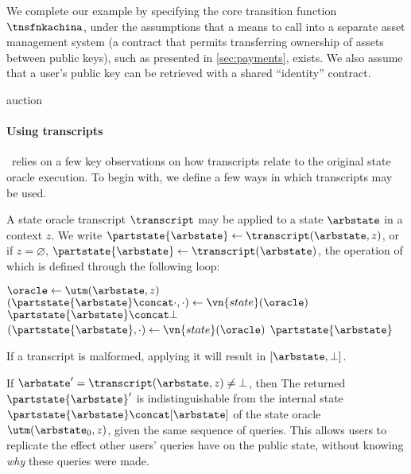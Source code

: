 We complete our example by specifying the core transition function $\tnsfnkachina$,
under the assumptions that a means to call into a separate asset management
system (a contract that permits transferring ownership of assets between public
keys), such as presented in \iffull\autoref{sec:payments}\else\cite[Appendix~J.4]{fullversion}\fi, exists. We also assume that
a user's public key can be retrieved with a shared ``identity'' contract.

{auction}


\paragraph{Using transcripts}
\kachina\ relies on a few key observations on how transcripts relate to the
original state oracle execution. To begin with, we define a few ways in which
transcripts may be used.
\begin{definition}
  A state oracle transcript $\transcript$ may be applied to a state $\arbstate$
  in a context $z$. We write $\partstate{\arbstate} \gets \transcript(\arbstate, z)$, or if
  $z = \varnothing$, $\partstate{\arbstate} \gets \transcript(\arbstate)$, the operation of
  which is defined through the following loop:
  \begin{algorithmic}
      \State \Let $\oracle \gets \utm(\arbstate, z)$
        \State {}
          \State \Let $(\partstate{\arbstate} \concat \cdot, \cdot) \gets \vn{state}(\oracle)$
          \State \Return $\partstate{\arbstate} \concat \bot$
        \EndIf
      \EndFor
      \State \Let $(\partstate{\arbstate}, \cdot) \gets \vn{state}(\oracle)$
      \State \Return $\partstate{\arbstate}$
    \EndFunction
  \end{algorithmic}
  If a transcript is malformed, applying it will result in $[\arbstate,
    \bot]$.
\end{definition}

If $\arbstate' = \transcript(\arbstate, z) \neq \bot$, then 
The returned $\partstate{\arbstate}'$ is indistinguishable from the internal state
$\partstate{\arbstate} \concat [\arbstate]$ of the state oracle $\utm(\arbstate_0,
z)$, given the same sequence of queries. This allows users to replicate the
effect other users' queries have on the public state, without knowing \emph{why}
these queries were made.

